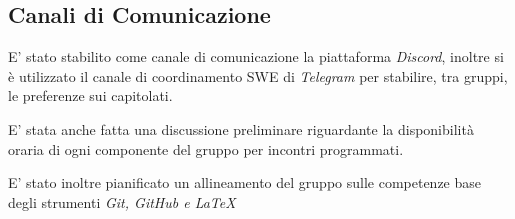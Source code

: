 \documentclass[a4paper, 11pt]{article}
\begin{document}
\subsection{Canali di Comunicazione}

E' stato stabilito come canale di comunicazione la piattaforma \textit{Discord}, inoltre si è utilizzato il canale di coordinamento SWE di \textit{Telegram} per stabilire, tra gruppi, le preferenze sui capitolati.

E’ stata anche fatta una discussione preliminare riguardante la disponibilità oraria di ogni componente del gruppo per incontri programmati. 

E' stato inoltre pianificato un allineamento del gruppo sulle competenze base degli strumenti \textit{Git, GitHub e \LaTeX}
\end{document}
